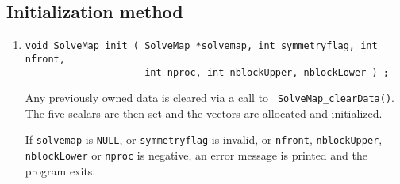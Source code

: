 \subsection{Initialization method}
\label{subsection:SolveMap:proto:init}
\par
\begin{enumerate}
\item
\begin{verbatim}
void SolveMap_init ( SolveMap *solvemap, int symmetryflag, int nfront,
                     int nproc, int nblockUpper, nblockLower ) ;
\end{verbatim}
Any previously owned data is cleared via a call to {\tt
SolveMap\_clearData()}.
The five scalars are then set and the vectors are allocated and
initialized.
\par {}
If {\tt solvemap} is {\tt NULL}, 
or {\tt symmetryflag} is invalid,
or {\tt nfront}, {\tt nblockUpper}, {\tt nblockLower} 
or {\tt nproc} is negative, 
an error message is printed and the program exits.
\end{enumerate}
\par
\par
